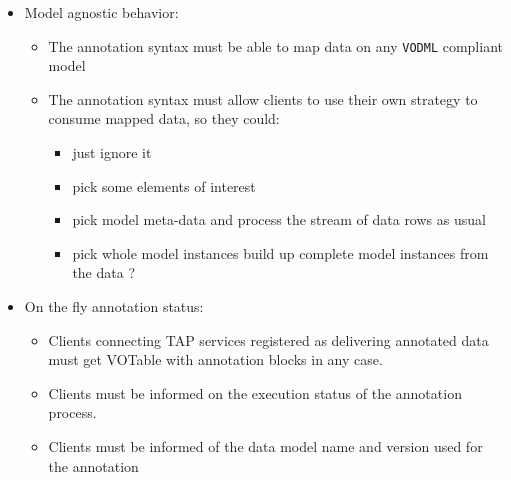 \begin {itemize}
  \item Model agnostic behavior:
  \begin {itemize}
    \item The annotation syntax must be able to map data on any \texttt{VODML} compliant model
    \item The annotation syntax must allow clients to use their own strategy to consume mapped data, so they could:
      \begin {itemize}
        \item just ignore it
        \item pick some elements of interest 
        \item pick model meta-data and process the stream of data rows as usual
        \item pick whole model instances     %
        build up complete model instances from the data ? 
      \end {itemize}
  \end {itemize}
  
  \item On the fly annotation status:
      \begin {itemize} 
          \item Clients connecting TAP services registered as delivering annotated data must get VOTable with annotation blocks in any case. 
          \item Clients must be informed on the execution status of the annotation process.     
          \item Clients must be informed of the data model name and version used for the annotation  
       \end {itemize}

\end {itemize}
